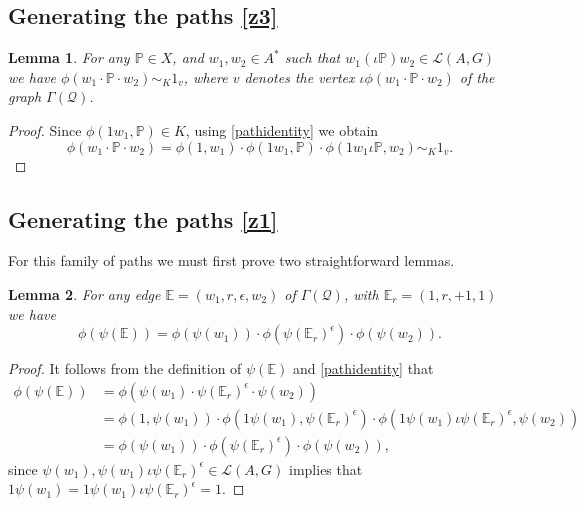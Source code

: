 \documentclass[11pt]{amsart}
\newtheorem{lem}{Lemma}
\theoremstyle{plain}
\begin{document}
\subsection*{Generating the paths \eqref{z3}}

\begin{lem}\label{type3}
For any $\mathbb{P} \in {X}$, and $w_1, w_2 \in A^*$ such that
$w_1 (\iota \mathbb{P}) w_2 \in {\mathcal{L}({A,G})}$ we have  $\phi(w_1 \cdot \mathbb{P} \cdot w_2) \sim_K 1_v$, where $v$ denotes the vertex $\iota \phi(w_1 \cdot \mathbb{P} \cdot w_2)$ of the graph $\Gamma(\mathcal{Q})$.
\end{lem}
\begin{proof}
Since $\phi(1 w_1, \mathbb{P}) \in {K}$, using \eqref{pathidentity} we obtain
\[
\phi(w_1 \cdot \mathbb{P} \cdot w_2) = \phi(1, w_1) \cdot \phi(1 w_1, \mathbb{P}) \cdot \phi(1 w_1 \iota \mathbb{P}, w_2) \sim_{{K}} 1_v.
\]
\end{proof}

\subsection*{Generating the paths \eqref{z1}}

For this family of paths we must first prove two straightforward lemmas.

\begin{lem}\label{triangle}
For any edge ${\mathbb{E}} = (w_1, r, \epsilon, w_2)$ of $\Gamma(\mathcal{Q})$, with ${\mathbb{E}}_r = (1,r,+1,1)$
 we have
\[
\phi(\psi({\mathbb{E}})) = \phi(\psi(w_1)) \cdot \phi(\psi({\mathbb{E}}_r)^{\epsilon}) \cdot \phi(\psi(w_2)).
\]
\end{lem}
\begin{proof}
It follows from the definition of $\psi({\mathbb{E}})$ and \eqref{pathidentity} that
\begin{align*}
\phi(\psi({\mathbb{E}}))  & =  \phi(\psi(w_1) \cdot \psi({\mathbb{E}}_r)^{\epsilon} \cdot \psi(w_2) ) \\
                  & =  \phi(1,\psi(w_1)) \cdot \phi(1 \psi(w_1), \psi({\mathbb{E}}_r)^{\epsilon}) \cdot
                       \phi(1\psi(w_1) \iota \psi({\mathbb{E}}_r)^{\epsilon}, \psi(w_2) ) \\
                 & =  \phi(\psi(w_1)) \cdot \phi(\psi({\mathbb{E}}_r)^{\epsilon}) \cdot \phi(\psi(w_2)),
\end{align*}
since $\psi(w_1),  \psi(w_1) \iota \psi({\mathbb{E}}_r)^{\epsilon} \in {\mathcal{L}({A,G})}$ implies that $1 \psi(w_1) = 1 \psi(w_1) \iota \psi({\mathbb{E}}_r)^{\epsilon} = 1$.
\end{proof}
\end{document}
